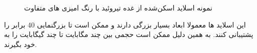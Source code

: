 \begin{figure}
\begin{center}
	\end{center}
	\caption{نمونه اسلاید اسکن‌شده از غده تیروئید با رنگ امیزی های متفاوت}
	\label{fig:samplecoloringfrompapsociety}
\end{figure}
این اسلاید ها معمولا ابعاد بسیار بزرگی دارند و ممکن است تا بزرگنمایی 40 برابر را پشتیبانی کنند.
به همین دلیل ممکن است حجمی بین چند مگابایت تا چند گیگابایت را به خود بگیرند.
